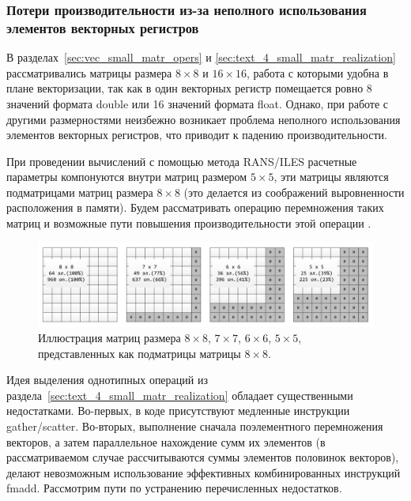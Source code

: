 \subsubsection{Потери производительности из-за неполного \mbox{использования} элементов векторных регистров}\label{sec:text_4_spec_matr}

В разделах~\ref{sec:vec_small_matr_opers} и \ref{sec:text_4_small_matr_realization} рассматривались матрицы размера $8 \times 8$ и $16 \times 16$, работа с которыми удобна в плане векторизации, так как в один векторных регистр помещается ровно 8 значений формата double или 16 значений формата float.
Однако, при работе с другими размерностями неизбежно возникает проблема неполного использования элементов векторных регистров, что приводит к падению производительности.

При проведении вычислений с помощью метода RANS/ILES\label{abbr:rans-3}\label{abbr:iles-3} расчетные параметры компонуются внутри матриц размером $5 \times 5$, эти матрицы являются подматрицами матриц размера $8 \times 8$ (это делается из соображений выровненности расположения в памяти).
Будем рассматривать операцию перемножения таких матриц и возможные пути повышения производительности этой операции \cite{Bendersky2018VecMat1}. 

\begin{figure}[ht]
\centering
\includegraphics[width=1.00\textwidth]{./fig/vec_spec_matrices.pdf}
\singlespacing
{}\caption{Иллюстрация матриц размера $8 \times 8$, $7 \times 7$, $6 \times 6$, $5 \times 5$, представленных как подматрицы матрицы $8 \times 8$.}
\label{fig:text_4_spec_matr_matrices}
\end{figure}

Идея выделения однотипных операций из раздела~\ref{sec:text_4_small_matr_realization} обладает существенными недостатками.
Во-первых, в коде присутствуют медленные инструкции gather/scatter.
Во-вторых, выполнение сначала поэлементного перемножения векторов, а затем параллельное нахождение сумм их элементов (в рассматриваемом случае рассчитываются суммы элементов половинок векторов), делают невозможным использование эффективных комбинированных инструкций fmadd.
Рассмотрим пути по устранению перечисленных недостатков.


